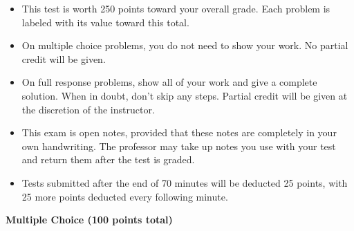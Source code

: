 \documentclass[12pt]{exam}
\newcommand{\<}{\langle}
\renewcommand{\>}{\rangle}
\begin{document}
\begin{center}
\end{center}
\vspace{0.1in}

\vspace{12pt}

\begin{itemize}
  \item This test is worth 250 points toward your overall grade.
        Each problem is labeled with its value toward this total.
  \item On multiple choice problems, you do not need to show your work. No
        partial credit will be given.
  \item On full response problems, show all of your work and give a
        complete solution. When in doubt, don't skip any steps. Partial
        credit will be given at the discretion of the instructor.
  \item This exam is open notes, provided that these notes are completely
        in your own handwriting. The professor may take up notes you use
        with your test and return them after the test is graded.
  \item Tests submitted after the end of 70 minutes will be deducted 25 points,
        with 25 more points deducted every following minute.
\end{itemize}

\newpage

\begin{center}
  \textbf{Multiple Choice (100 points total)}
\end{center}
\end{document}

